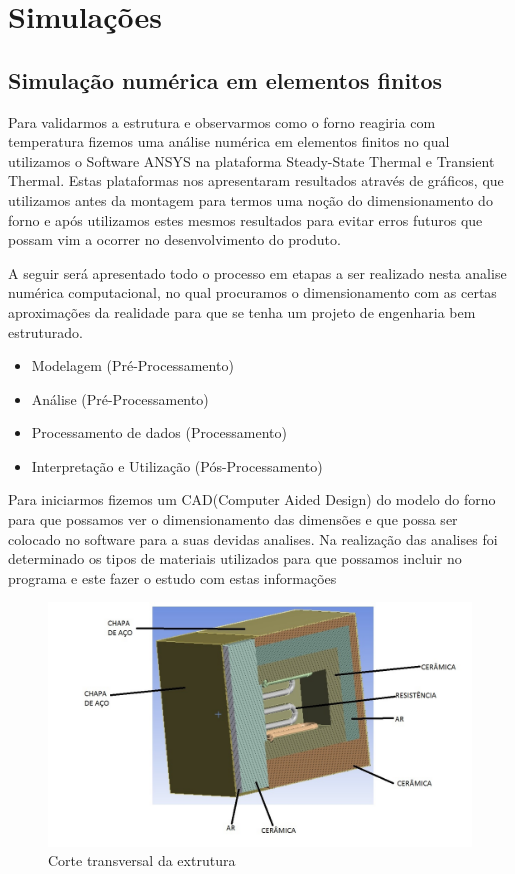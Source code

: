\section{Simulações}
\subsection{Simulação numérica em elementos finitos}
Para validarmos a estrutura e observarmos como o forno reagiria com temperatura fizemos
uma análise numérica em elementos finitos no qual utilizamos o Software ANSYS na plataforma
Steady-State Thermal e Transient Thermal. Estas plataformas nos apresentaram resultados através
de gráficos, que utilizamos antes da montagem para termos uma noção do dimensionamento do
forno e após utilizamos estes mesmos resultados para evitar erros futuros que possam vim a ocorrer
no desenvolvimento do produto.

A seguir será apresentado todo o processo em etapas a ser realizado nesta analise numérica
computacional, no qual procuramos o dimensionamento com as certas aproximações da realidade
para que se tenha um projeto de engenharia bem estruturado.
\begin{itemize}
	\item Modelagem (Pré-Processamento)
	\item Análise (Pré-Processamento)
	\item Processamento de dados (Processamento)
	\item Interpretação e Utilização (Pós-Processamento)
\end{itemize}

Para iniciarmos fizemos um CAD(Computer Aided Design) do modelo do forno para que
possamos ver o dimensionamento das dimensões e que possa ser colocado no software para a suas
devidas analises. Na realização das analises foi determinado os tipos de materiais utilizados para que
possamos incluir no programa e este fazer o estudo com estas informações
\begin{figure}[ht]
	\centering
	\label{ansys1}
	\includegraphics[keepaspectratio=true,scale=0.8]{figuras/ansys1.jpg}
	\caption{Corte transversal da extrutura}
\end{figure}

